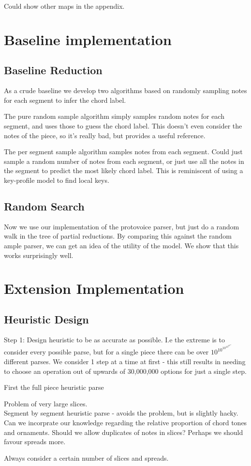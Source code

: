 \documentclass[12pt,a4paper,twoside,openright]{report}
\theoremstyle{definition}
\begin{document}
\par 
Could show other maps in the appendix.

\section{Baseline implementation}


\subsection{Baseline Reduction}
As a crude baseline we develop two algorithms based on randomly sampling notes for each segment to infer the chord label. 
\par
The pure random sample algorithm simply samples random notes for each segment, and uses those to guess the chord label. This doesn't even consider the notes of the piece, so it's really bad, but provides a useful reference.
\par 
The per segment sample algorithm samples notes from each segment. Could just sample a random number of notes from each segment, or just use all the notes in the segment to predict the most likely chord label. This is reminiscent of using a key-profile model \cite{temperleyBayesianApproachKeyFinding2002} to find local keys.

\FloatBarrier
\subsection{Random Search}
Now we use our implementation of the protovoice parser, but just do a random walk in the tree of partial reductions. By comparing this against the random ample parser, we can get an idea of the utility of the model. We show that this works surprisingly well.

\FloatBarrier
\section{Extension Implementation}

\subsection{Heuristic Design}
Step 1: Design heuristic to be as accurate as possible. I.e the extreme is to consider every possible parse, but for a single piece there can be over $10^{10^{10^{10^{10^{10}}}}}$ different parses. We consider 1 step at a time at first - this still results in needing to choose an operation out of upwards of 30,000,000 options for just a single step.     
\par
First the full piece heuristic parse 
\par
Problem of very large slices.\\ 
Segment by segment heuristic parse - avoids the problem, but is slightly hacky. Can we incorprate our knowledge regarding the relative proportion of chord tones and ornaments. Should we allow duplicates of notes in slices? Perhaps we should favour spreads more. 
\par
Always consider a certain number of slices and spreads.
\par
\end{document}
